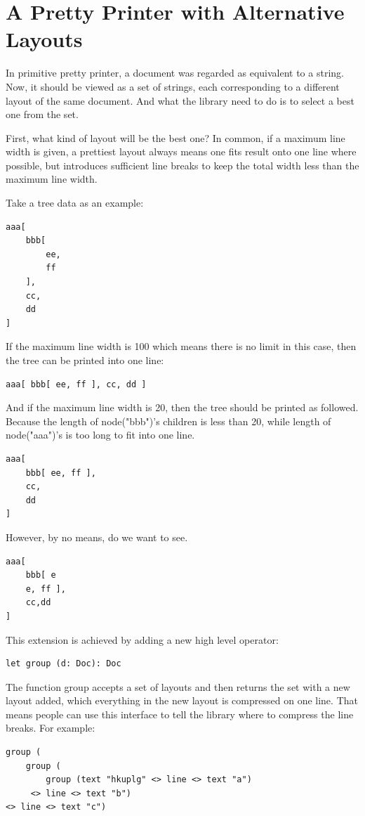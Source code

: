 \section{A Pretty Printer with Alternative Layouts} \label{section:printer}

In primitive pretty printer, a document was regarded as equivalent to a string. Now, it should be viewed as a set of strings, each corresponding to a different layout of the same document. And what the library need to do is to select a best one from the set.

First, what kind of layout will be the best one? In common, if a maximum line width is given, a prettiest layout always means one fits result onto one line where possible, but introduces sufficient line breaks to keep the total width less than the maximum line width\cite{wadler2003prettier}.

Take a tree data as an example:
\begin{lstlisting}
aaa[
    bbb[
        ee,
        ff
    ],
    cc,
    dd
]
\end{lstlisting}

If the maximum line width is 100 which means there is no limit in this case, then the tree can be printed into one line:
\begin{lstlisting}
aaa[ bbb[ ee, ff ], cc, dd ]
\end{lstlisting}

And if the maximum line width is 20, then the tree should be printed as followed. Because the length of node("bbb")'s children is less than 20, while length of node("aaa")'s is too long to fit into one line.
\begin{lstlisting}
aaa[
    bbb[ ee, ff ],
    cc,
    dd
]
\end{lstlisting}

However, by no means, do we want to see.
\begin{lstlisting}
aaa[
    bbb[ e
    e, ff ],
    cc,dd
]
\end{lstlisting}

This extension is achieved by adding a new high level operator:
\begin{lstlisting}
let group (d: Doc): Doc
\end{lstlisting}

The function group accepts a set of layouts and then returns the set with a new layout added, which everything in the new layout is compressed on one line. That means people can use this interface to tell the library where to compress the line breaks.
For example:
\begin{lstlisting}
group (
    group (
        group (text "hkuplg" <> line <> text "a")
     <> line <> text "b")
<> line <> text "c")
\end{lstlisting}

